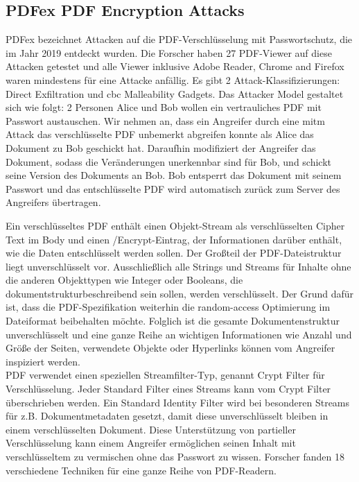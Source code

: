 \subsection{PDFex PDF Encryption Attacks}
PDFex bezeichnet Attacken auf die PDF-Verschlüsselung mit Passwortschutz, die im Jahr 2019 entdeckt wurden. Die Forscher haben 27 PDF-Viewer auf diese Attacken getestet und alle Viewer inklusive Adobe Reader, Chrome and Firefox waren mindestens für eine Attacke anfällig. Es gibt 2 Attack-Klassifizierungen: Direct Exfiltration und \gls{cbc} Malleability Gadgets.
Das Attacker Model gestaltet sich wie folgt: 2 Personen Alice und Bob wollen ein vertrauliches PDF mit Passwort austauschen. Wir nehmen an, dass ein Angreifer durch eine \gls{mitm} Attack das verschlüsselte PDF unbemerkt abgreifen konnte als Alice das Dokument zu Bob geschickt hat. Daraufhin modifiziert der Angreifer das Dokument, sodass die Veränderungen unerkennbar sind für Bob, und schickt seine Version des Dokuments an Bob. Bob entsperrt das Dokument mit seinem Passwort und das entschlüsselte PDF wird automatisch zurück zum Server des Angreifers übertragen. \cite{ccc-break-pdf, pdfex}
\par
Ein verschlüsseltes PDF enthält einen Objekt-Stream als verschlüsselten Cipher Text im Body und einen /Encrypt-Eintrag, der Informationen darüber enthält, wie die Daten entschlüsselt werden sollen. Der Großteil der PDF-Dateistruktur liegt unverschlüsselt vor. Ausschließlich alle Strings und Streams für Inhalte ohne die anderen Objekttypen wie Integer oder Booleans, die dokumentstrukturbeschreibend sein sollen, werden verschlüsselt. Der Grund dafür ist, dass die PDF-Spezifikation weiterhin die random-access Optimierung im Dateiformat beibehalten möchte. Folglich ist die gesamte Dokumentenstruktur unverschlüsselt und eine ganze Reihe an wichtigen Informationen wie Anzahl und Größe der Seiten, verwendete Objekte oder Hyperlinks können vom Angreifer inspiziert werden. \\
PDF verwendet einen speziellen Streamfilter-Typ, genannt Crypt Filter für Verschlüsselung. Jeder Standard Filter eines Streams kann vom Crypt Filter überschrieben werden. Ein Standard Identity Filter wird bei besonderen Streams für z.B. Dokumentmetadaten gesetzt, damit diese unverschlüsselt bleiben in einem verschlüsselten Dokument. Diese Unterstützung von partieller Verschlüsselung kann einem Angreifer ermöglichen seinen Inhalt mit verschlüsseltem zu vermischen ohne das Passwort zu wissen. Forscher fanden 18 verschiedene Techniken für eine ganze Reihe von PDF-Readern. \cite{ccc-break-pdf}
